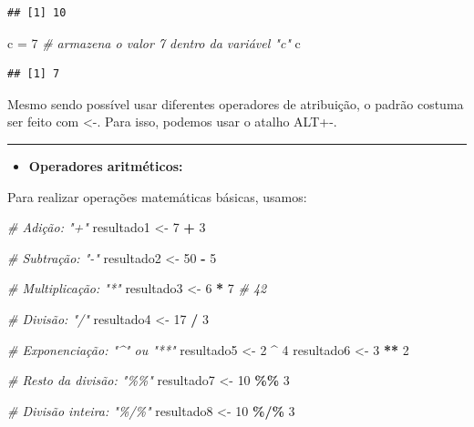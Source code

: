 \documentclass[
]{book}
\newenvironment{Shaded}{\begin{snugshade}}{\end{snugshade}}
\newcommand{\CommentTok}[1]{\textcolor[rgb]{0.56,0.35,0.01}{\textit{#1}}}
\newcommand{\DecValTok}[1]{\textcolor[rgb]{0.00,0.00,0.81}{#1}}
\newcommand{\NormalTok}[1]{#1}
\newcommand{\OtherTok}[1]{\textcolor[rgb]{0.56,0.35,0.01}{#1}}
\newcommand{\SpecialCharTok}[1]{\textcolor[rgb]{0.81,0.36,0.00}{\textbf{#1}}}
\providecommand{\tightlist}{%
  \setlength{\itemsep}{0pt}\setlength{\parskip}{0pt}}
\begin{document}
\begin{verbatim}
## [1] 10
\end{verbatim}

\begin{Shaded}
\begin{Highlighting}[]
\NormalTok{c }\OtherTok{=} \DecValTok{7} \CommentTok{\# armazena o valor 7 dentro da variável "c"}
\NormalTok{c}
\end{Highlighting}
\end{Shaded}

\begin{verbatim}
## [1] 7
\end{verbatim}

Mesmo sendo possível usar diferentes operadores de atribuição, o padrão costuma ser feito com \textless-. Para isso, podemos usar o atalho ALT+-.

\begin{center}\rule{0.5\linewidth}{0.5pt}\end{center}

\begin{itemize}
\tightlist
\item
  \textbf{Operadores aritméticos:}
\end{itemize}

Para realizar operações matemáticas básicas, usamos:

\begin{Shaded}
\begin{Highlighting}[]
\CommentTok{\# Adição: "+"}
\NormalTok{resultado1 }\OtherTok{\textless{}{-}} \DecValTok{7} \SpecialCharTok{+} \DecValTok{3}

\CommentTok{\# Subtração: "{-}"}
\NormalTok{resultado2 }\OtherTok{\textless{}{-}} \DecValTok{50} \SpecialCharTok{{-}} \DecValTok{5}

\CommentTok{\# Multiplicação: "*"}
\NormalTok{resultado3 }\OtherTok{\textless{}{-}} \DecValTok{6} \SpecialCharTok{*} \DecValTok{7}  \CommentTok{\# 42}

\CommentTok{\# Divisão: "/"}
\NormalTok{resultado4 }\OtherTok{\textless{}{-}} \DecValTok{17} \SpecialCharTok{/} \DecValTok{3}

\CommentTok{\# Exponenciação: "\^{}" ou "**"}
\NormalTok{resultado5 }\OtherTok{\textless{}{-}} \DecValTok{2} \SpecialCharTok{\^{}} \DecValTok{4} 
\NormalTok{resultado6 }\OtherTok{\textless{}{-}} \DecValTok{3} \SpecialCharTok{**} \DecValTok{2}

\CommentTok{\# Resto da divisão: "\%\%"}
\NormalTok{resultado7 }\OtherTok{\textless{}{-}} \DecValTok{10} \SpecialCharTok{\%\%} \DecValTok{3} 

\CommentTok{\# Divisão inteira: "\%/\%"}
\NormalTok{resultado8 }\OtherTok{\textless{}{-}} \DecValTok{10} \SpecialCharTok{\%/\%} \DecValTok{3}
\end{Highlighting}
\end{Shaded}
\end{document}
